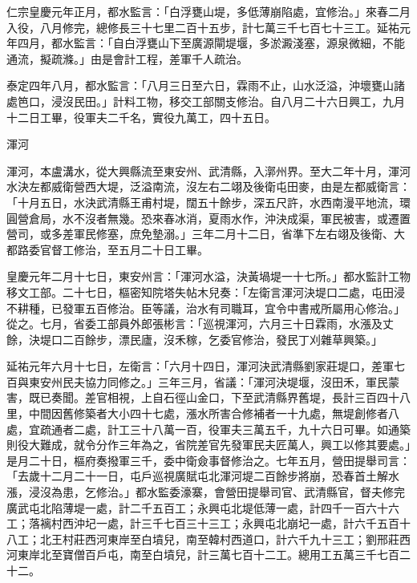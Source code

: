 \begin{pinyinscope}
 仁宗皇慶元年正月，都水監言：「白浮甕山堤，多低薄崩陷處，宜修治。」來春二月入役，八月修完，總修長三十七里二百十五步，計七萬三千七百七十三工。延祐元年四月，都水監言：「自白浮甕山下至廣源閘堤堰，多淤澱淺塞，源泉微細，不能通流，擬疏滌。」由是會計工程，差軍千人疏治。



 泰定四年八月，都水監言：「八月三日至六日，霖雨不止，山水泛溢，沖壞甕山諸處笆口，浸沒民田。」計料工物，移交工部關支修治。自八月二十六日興工，九月十二日工畢，役軍夫二千名，實役九萬工，四十五日。



 渾河



 渾河，本盧溝水，從大興縣流至東安州、武清縣，入漷州界。至大二年十月，渾河水決左都威衛營西大堤，泛溢南流，沒左右二翊及後衛屯田麥，由是左都威衛言：「十月五日，水決武清縣王甫村堤，闊五十餘步，深五尺許，水西南漫平地流，環圓營倉局，水不沒者無幾。恐來春冰消，夏雨水作，沖決成渠，軍民被害，或遷置營司，或多差軍民修塞，庶免墊溺。」三年二月十二日，省準下左右翊及後衛、大都路委官督工修治，至五月二十日工畢。



 皇慶元年二月十七日，東安州言：「渾河水溢，決黃堝堤一十七所。」都水監計工物移文工部。二十七日，樞密知院塔失帖木兒奏：「左衛言渾河決堤口二處，屯田浸不耕種，已發軍五百修治。臣等議，治水有司職耳，宜令中書戒所屬用心修治。」從之。七月，省委工部員外郎張彬言：「巡視渾河，六月三十日霖雨，水漲及丈餘，決堤口二百餘步，漂民廬，沒禾稼，乞委官修治，發民丁刈雜草興築。」



 延祐元年六月十七日，左衛言：「六月十四日，渾河決武清縣劉家莊堤口，差軍七百與東安州民夫協力同修之。」三年三月，省議：「渾河決堤堰，沒田禾，軍民蒙害，既已奏聞。差官相視，上自石徑山金口，下至武清縣界舊堤，長計三百四十八里，中間因舊修築者大小四十七處，漲水所害合修補者一十九處，無堤創修者八處，宜疏通者二處，計工三十八萬一百，役軍夫三萬五千，九十六日可畢。如通築則役大難成，就令分作三年為之，省院差官先發軍民夫匠萬人，興工以修其要處。」是月二十日，樞府奏撥軍三千，委中衛僉事督修治之。七年五月，營田提舉司言：「去歲十二月二十一日，屯戶巡視廣賦屯北渾河堤二百餘步將崩，恐春首土解水漲，浸沒為患，乞修治。」都水監委濠寨，會營田提舉司官、武清縣官，督夫修完廣武屯北陷薄堤一處，計二千五百工；永興屯北堤低薄一處，計四千一百六十六工；落褵村西沖圮一處，計三千七百三十三工；永興屯北崩圮一處，計六千五百十八工；北王村莊西河東岸至白墳兒，南至韓村西道口，計六千九十三工；劉邢莊西河東岸北至寶僧百戶屯，南至白墳兒，計三萬七百十二工。總用工五萬三千七百二十二。




\end{pinyinscope}
